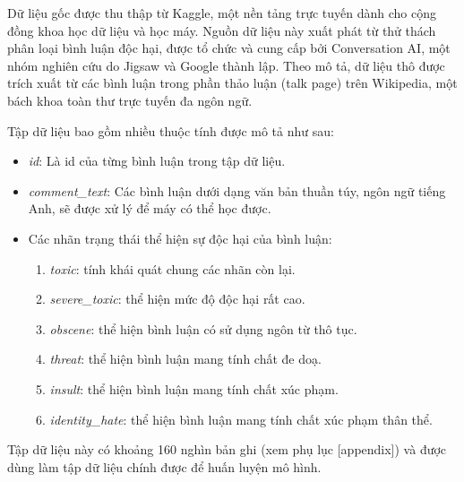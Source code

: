 Dữ liệu gốc được thu thập từ Kaggle, một nền tảng trực tuyến dành cho cộng đồng khoa học dữ liệu và học máy. Nguồn dữ liệu này xuất phát từ thử thách phân loại bình luận độc hại, được tổ chức và cung cấp bởi Conversation AI, một nhóm nghiên cứu do Jigsaw và Google thành lập. Theo mô tả, dữ liệu thô được trích xuất từ các bình luận trong phần thảo luận (talk page) trên Wikipedia, một bách khoa toàn thư trực tuyến đa ngôn ngữ.

Tập dữ liệu bao gồm nhiều thuộc tính được mô tả như sau:
\begin{itemize}
    \item \textit{id}: Là id của từng bình luận trong tập dữ liệu.
    \item \textit{comment\_text}: Các bình luận dưới dạng văn bản thuần túy, ngôn ngữ tiếng Anh, sẽ được xử lý để máy có thể học được.
    \item Các nhãn trạng thái thể hiện sự độc hại của bình luận:
          \begin{enumerate}
              \item \textit{toxic}: tính khái quát chung các nhãn còn lại.
              \item \textit{severe\_toxic}: thể hiện mức độ độc hại rất cao.
              \item \textit{obscene}: thể hiện bình luận có sử dụng ngôn từ thô tục.
              \item \textit{threat}: thể hiện bình luận mang tính chất đe doạ.
              \item \textit{insult}: thể hiện bình luận mang tính chất xúc phạm.
              \item \textit{identity\_hate}: thể hiện bình luận mang tính chất xúc phạm thân thể.
          \end{enumerate}
\end{itemize}

Tập dữ liệu này có khoảng 160 nghìn bản ghi (xem phụ lục [appendix]) và được dùng làm tập dữ liệu chính được để huấn luyện mô hình.
